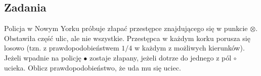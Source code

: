 \subsection{Zadania}

\setcounter{problem}{0}

\begin{problem}
  Policja w Nowym Yorku próbuje złapać przestępce znajdującego się w punkcie $\otimes$. Obstawiła część ulic, ale nie wszystkie. Przestępca w każdym korku porusza się losowo (tzn. z prawdopodobieństwem $1/4$ w każdym z możliwych kierunków). Jeżeli wpadnie na policję $\bullet$ zostaje złapany, jeżeli dotrze do jednego z pól $\circ$ ucieka. Oblicz prawdopodobieństwo, że uda mu się uciec.

  \begin{center}\end{center}
\end{problem}

